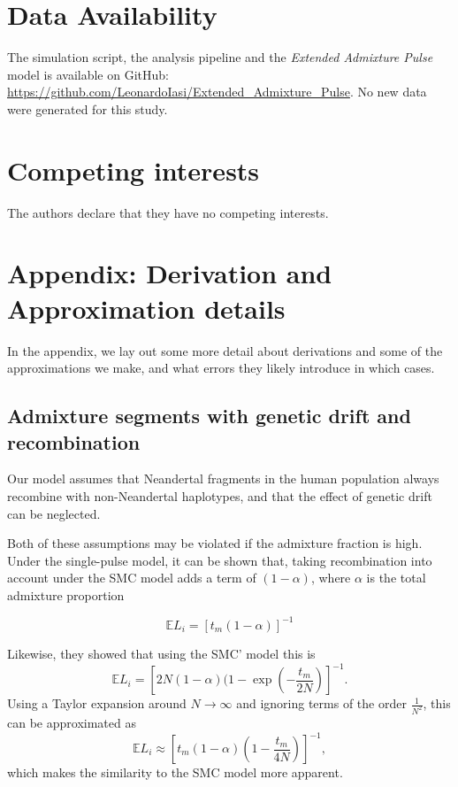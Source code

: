 \documentclass[11pt]{article}
\begin{document}
\section{Data Availability}\label{Data Availability}

The simulation script, the analysis pipeline and the \emph{Extended Admixture Pulse} model is  available  on  GitHub: \url{https://github.com/LeonardoIasi/Extended_Admixture_Pulse}. No new data were generated for this study.

\section{Competing interests}

The authors declare that they have no competing interests.


\appendix
\section{Appendix: Derivation and Approximation details}
\setcounter{equation}{0}
\renewcommand{\theequation}{A\arabic{equation}}
In the appendix, we lay out some more detail about derivations and some of the approximations we make, and what errors they likely introduce in which cases.

\subsection{Admixture segments with genetic drift and recombination}\label{Appendix_1}

Our model assumes that Neandertal fragments in the human population always recombine with non-Neandertal haplotypes, and that the effect of genetic drift can be neglected. 

Both of these assumptions may be violated if the admixture fraction is high. Under the single-pulse model, it can be shown that, taking recombination into account under the SMC model \cite{mcvean_approximating_2005}  adds a term of $(1-\alpha)$, where $\alpha$ is the total admixture proportion \cite{liang_lengths_2014}

\begin{equation}
    \mathbb{E}L_i = \left[t_m (1-\alpha) \right]^{-1}
\end{equation}

Likewise, they showed that using the SMC' model \citep{marjoram_fast_2006} this is
$$
\mathbb{E}L_i = \left[2N(1-\alpha)(1-\exp\left(-\frac{t_m}{2N}\right)\right]^{-1} \text{.}
$$
Using a Taylor expansion around $N \to \infty$ and ignoring terms of the order $\frac{1}{N^2}$, this can be approximated as 
\begin{equation}
  \mathbb{E}L_i \approx  \left[t_m(1-\alpha)\left(1-\frac{t_m}{4N}\right)\right]^{-1},
\end{equation}
which makes the similarity to the SMC model more apparent.
\end{document}
